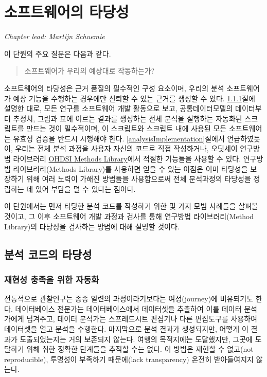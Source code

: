 \documentclass[11pt]{book}
\theoremstyle{definition}
\theoremstyle{definition}
\theoremstyle{definition}
\theoremstyle{remark}
\begin{document}
\chapter{소프트웨어의 타당성}\label{SoftwareValidity}

\emph{Chapter lead: Martijn Schuemie}

이 단원의 주요 질문은 다음과 같다.

\begin{quote}
소프트웨어가 우리의 예상대로 작동하는가?
\end{quote}

소프트웨어의 타당성은 근거 품질의 필수적인 구성 요소이며, 우리의 분석
소프트웨어가 예상 기능을 수행하는 경우에만 신뢰할 수 있는 근거를 생성할
수 있다. \ref{automation}절에 설명한 대로, 모든 연구를 소프트웨어 개발
활동으로 보고, 공통데이터모델의 데이터부터 추정치, 그림과 표에 이르는
결과를 생성하는 전체 분석을 실행하는 자동화된 스크립트를 만드는 것이
필수적이며, 이 스크립트와 스크립트 내에 사용된 모든 소프트웨어는 유효성
검증을 반드시 시행해야 한다. \ref{analysisImplementation}절에서
언급하였듯이, 우리는 전체 분석 과정을 사용자 자신의 코드로 직접
작성하거나, 오딧세이 연구방법 라이브러리
\href{https://ohdsi.github.io/MethodsLibrary/}{OHDSI Methods
Library}에서 적절한 기능들을 사용할 수 있다. 연구방법 라이브러리(Methods
Library)를 사용하면 얻을 수 있는 이점은 이미 타당성을 보장하기 위해 여러
노력이 가해진 방법들을 사용함으로써 전체 분석과정의 타당성을 정립하는 데
있어 부담을 덜 수 있다는 점이다. 

이 단원에서는 먼저 타당한 분석 코드를 작성하기 위한 몇 가지 모범
사례들을 살펴볼 것이고, 그 이후 소프트웨어 개발 과정과 검사를 통해
연구방법 라이브러리(Method Library)의 타당성을 검사하는 방법에 대해
설명할 것이다. 

\section{분석 코드의 타당성}\label{--}

\subsection{재현성 충족을 위한 자동화}\label{automation}

전통적으로 관찰연구는 종종 일련의 과정이라기보다는 여정(journey)에
비유되기도 한다. 데이터베이스 전문가는 데이터베이스에서 데이터셋을
추출하여 이를 데이터 분석가에게 넘겨주고, 데이터 분석가는 스프레드시트
편집기나 다른 편집도구를 사용하여 데이터셋을 열고 분석을 수행한다.
마지막으로 분석 결과가 생성되지만, 어떻게 이 결과가 도출되었는지는 거의
보존되지 않는다. 여행의 목적지에는 도달했지만, 그곳에 도달하기 위해 취한
정확한 단계들을 추적할 수는 없다. 이 방법은 재현할 수 없고(not
reproducible), 투명성이 부족하기 때문에(lack transparency) 온전히
받아들여지지 않는다. 
\end{document}
